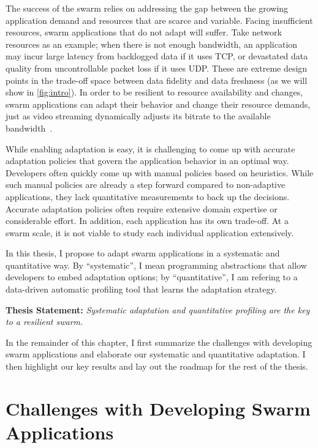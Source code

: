 \documentclass[thesis.tex]{subfiles}
\begin{document}
The success of the swarm relies on addressing the gap between the growing
application demand and resources that are scarce and variable. Facing
insufficient resources, swarm applications that do not adapt will suffer. Take
network resources as an example; when there is not enough bandwidth, an
application may incur large latency from backlogged data if it uses TCP, or
devastated data quality from uncontrollable packet loss if it uses UDP. These
are extreme design points in the trade-off space between data fidelity and data
freshness (as we will show in \autoref{fig:intro}). In order to be resilient to
resource availability and changes, swarm applications can adapt their behavior
and change their resource demands, just as video streaming dynamically adjusts
its bitrate to the available bandwidth~\cite{michalos2012dynamic}.

While enabling adaptation is easy, it is challenging to come up with accurate
adaptation policies that govern the application behavior in an optimal
way. Developers often quickly come up with manual policies based on
heuristics. While such manual policies are already a step forward compared to
non-adaptive applications, they lack quantitative measurements to back up the
decisions. Accurate adaptation policies often require extensive domain expertise
or considerable effort. In addition, each application has its own trade-off. At
a swarm scale, it is not viable to study each individual application
extensively.

In this thesis, I propose to adapt swarm applications in a systematic and
quantitative way. By ``systematic'', I mean programming abstractions that
allow developers to embed adaptation options; by ``quantitative'', I am refering
to a data-driven automatic profiling tool that learns the adaptation strategy.

\vspace{1em}

\noindent\textbf{Thesis Statement:} \textit{Systematic adaptation and
  quantitative profiling are the key to a resilient swarm.}

\vspace{1em}

In the remainder of this chapter, I first summarize the challenges with
developing swarm applications and elaborate our systematic and quantitative
adaptation. I then highlight our key results and lay out the roadmap for the rest
of the thesis.

\section{Challenges with Developing Swarm Applications}
\label{sec:chall-with-exist}
\end{document}
